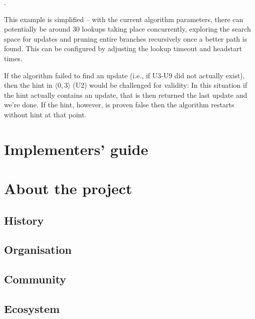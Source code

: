 .

This example is simplified -- with the current algorithm parameters, there can potentially be around 30 lookups taking place concurrently, exploring the search space for updates and pruning entire branches recursively once a better path is found. This can be configured by adjusting the lookup timeout and headstart times.

If the algorithm failed to find an update (i.e., if U3-U9 did not actually exist), then the hint in $\langle  0, 3 \rangle$ (U2) would be challenged for validity: In this situation if the hint actually contains an update, that is then returned the last update and we're done. If the hint, however, is proven false then the algorithm restarts without hint at that point.


\chapter{Implementers' guide}



\chapter{About the project}\label{sec:about}
\section{History}
\section{Organisation}
\section{Community}
\section{Ecosystem}